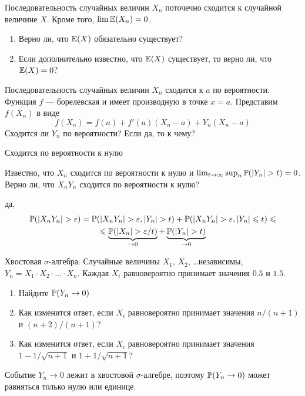 \begin{problem}
Последовательность случайных величин $X_n$ поточечно сходится к случайной величине $X$. Кроме того, $\lim \E(X_n)=0$.
\begin{enumerate}
\item Верно ли, что $\E(X)$ обязательно существует?
\item Если дополнительно известно, что $\E(X)$ существует, то верно ли, что $\E(X)=0$?
\end{enumerate}

\begin{sol}

\end{sol}
\end{problem}

\begin{problem}
Последовательность случайных величин $X_n$ сходится к $a$ по вероятности. Функция $f$ — борелевская и имеет производную в точке $x=a$. Представим $f(X_n)$ в виде
\begin{equation}
f(X_n)=f(a)+f'(a)(X_n-a)+Y_n(X_n-a)
\end{equation}
Сходится ли $Y_n$ по вероятности? Если да, то к чему?

\begin{sol}
Сходится по вероятности к нулю
\end{sol}
\end{problem}

\begin{problem}
Известно, что $X_n$ сходится по вероятности к нулю и $\lim_{t\to\infty} \sup_n \P(|Y_n|>t)=0$. Верно ли, что $X_n Y_n$ сходится по вероятности к нулю?

\begin{sol}
да,
\begin{multline}
\P(|X_nY_n|>\varepsilon)=\P(|X_nY_n|>\varepsilon, |Y_n|>t)+\P(|X_nY_n|>\varepsilon, |Y_n|\leq t)\leq \\
\leq \underbrace{\P(|X_n|>\varepsilon/t)}_{\to 0}+\underbrace{\P(|Y_n|>t)}_{\to 0}
\end{multline}
\end{sol}
\end{problem}

\begin{problem}
Хвостовая $\sigma$-алгебра. Случайные величины $X_1$, $X_2$, \ldots независимы, $Y_n=X_1\cdot X_2\cdot\ldots\cdot X_n$. Каждая $X_i$ равновероятно принимает значения $0.5$ и $1.5$.
\begin{enumerate}
\item Найдите $\P(Y_n \to 0)$
\item Как изменится ответ, если $X_i$ равновероятно принимает значения $n/(n+1)$ и $(n+2)/(n+1)$?
\item Как изменится ответ, если $X_i$ равновероятно принимает значения $1-1/\sqrt{n+1}$ и $1+1/\sqrt{n+1}$?
\end{enumerate}

\begin{sol}
Событие $Y_n\to 0$ лежит в хвостовой $\sigma$-алгебре, поэтому $\P(Y_n\to 0)$ может равняться только нулю или единице.
\end{sol}
\end{problem}

